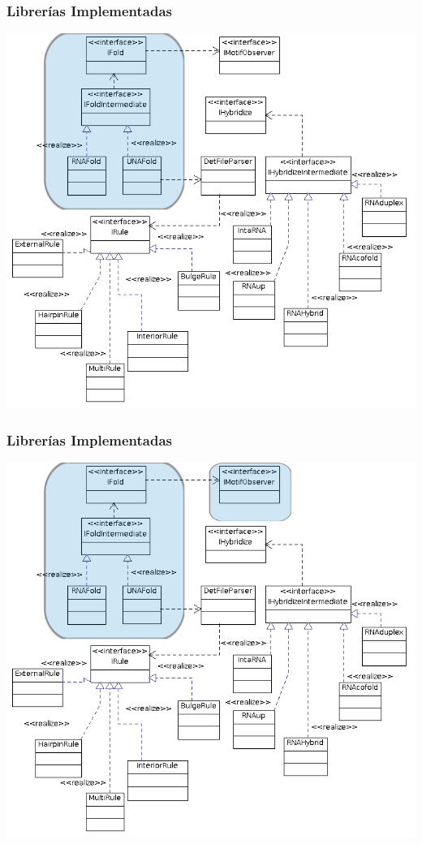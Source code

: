       \begin{frame}\frametitle{\textbf{Librerías Implementadas}}
        \begin{center}
          \includegraphics[scale=.3]{images/fideoInterface3.png}
        \end{center}
      \end{frame}

      \begin{frame}\frametitle{\textbf{Librerías Implementadas}}
        \begin{center}
          \includegraphics[scale=.3]{images/fideoInterface4.png}
        \end{center}
      \end{frame}

